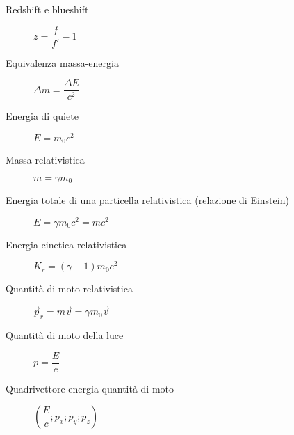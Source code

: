 \documentclass[a4paper,11pt,italian]{article}
\begin{document}
\begin{description}
  \item[Redshift e blueshift] $ z = \dfrac{f}{f'} - 1 $
%   
%   
  
   \item[Equivalenza massa-energia] %
  $ \Delta m = \dfrac{\Delta E}{c^2} $
  
  \item[Energia di quiete]%
  $ E = m_0 c^2 $
  
  \item[Massa relativistica]
  $ m = \gamma m_0 $
  
  \item[Energia totale di una particella relativistica (relazione di Einstein)]
  $ E = \gamma m_0 c^2 = mc^2$
  
  
  \item[Energia cinetica relativistica] 
  $ K_r = (\gamma -1) m_0 c^2 $

  \item[Quantità di moto relativistica] 
  $ \vec{p}_r = m \vec{v} = \gamma m_0 \vec{v} $

  \item[Quantità di moto della luce] %
  $ p = \dfrac{E}{c} $

  \item[Quadrivettore energia-quantità di moto]
  $ \left( \dfrac{E}{c}; p_x ; p_y ; p_z \right) $
  
%   
\end{description}
\end{document}
